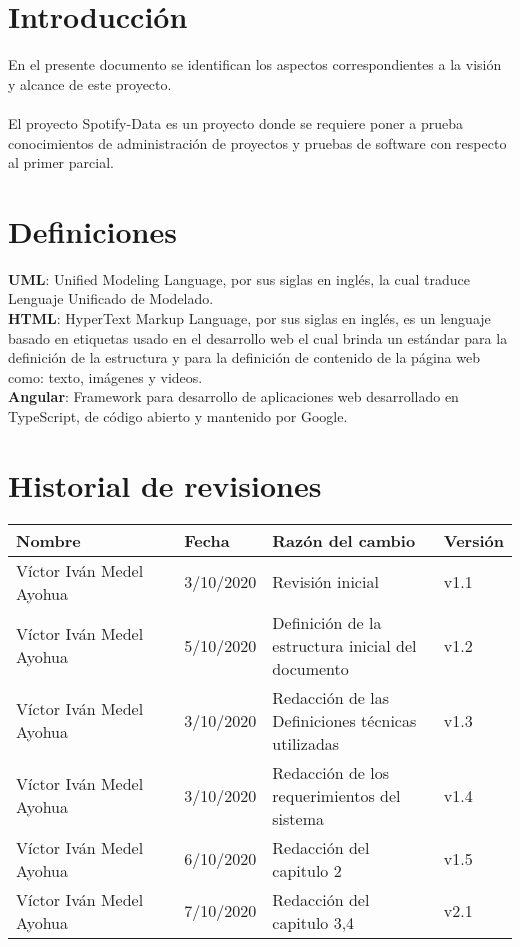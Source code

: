 \documentclass[12pt,a4paper]{book}
\date{\today}
\begin{document}
 	

\tableofcontents
\newpage
\section{Introducción}
\vspace{0.5 cm}
En el presente documento se identifican los aspectos correspondientes a la visión y alcance de este proyecto.\\
\\ El proyecto Spotify-Data es un proyecto donde se requiere poner a prueba conocimientos de administración de proyectos y pruebas de software con respecto al primer parcial.
		
\section{Definiciones}
\vspace{0.5 cm}
\textbf {UML}: Unified Modeling Language, por sus siglas en inglés, la cual traduce
Lenguaje Unificado de Modelado.\\

\textbf {HTML}: HyperText Markup Language, por sus siglas en inglés, es un lenguaje
basado en etiquetas usado en el desarrollo web el cual brinda un estándar para
la definición de la estructura y para la definición de contenido de la página web
como: texto, imágenes y videos.\\

\textbf {Angular}: Framework para desarrollo de aplicaciones web desarrollado en TypeScript, de código abierto y mantenido por Google.\\

\section{Historial de revisiones}
\vspace{0.5 cm}
\begin{table}[h!]
\centering
\begin{tabular}{|p{0.35\linewidth}|p{0.15\linewidth}|p{0.35\linewidth}|p{0.15\linewidth}|}
\hline
\textbf{Nombre}&\textbf{Fecha}&\textbf{Razón del cambio}&\textbf{Versión}
\\\hline
Víctor Iván Medel Ayohua&3/10/2020&Revisión inicial&v1.1\\\hline
Víctor Iván Medel Ayohua&5/10/2020&Definición de la estructura inicial del documento&v1.2\\\hline
Víctor Iván Medel Ayohua&3/10/2020&Redacción de las Definiciones técnicas utilizadas&v1.3\\\hline
Víctor Iván Medel Ayohua&3/10/2020&Redacción de los requerimientos del sistema&v1.4\\\hline
Víctor Iván Medel Ayohua&6/10/2020&Redacción del capitulo 2&v1.5\\\hline
Víctor Iván Medel Ayohua&7/10/2020&Redacción del capitulo 3,4 &v2.1\\\hline
\end{tabular}
\end{table}
\end{document}

